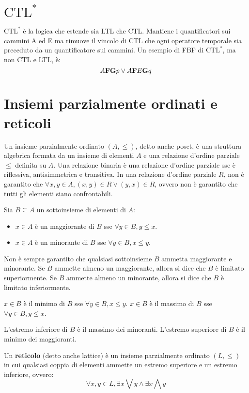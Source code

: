 \section{$\text{CTL}^*$}
$\text{CTL}^*$ è la logica che estende sia LTL che CTL. Mantiene i quantificatori
sui cammini A ed E ma rimuove il vincolo di CTL che ogni operatore temporale
sia preceduto da un quantificatore sui cammini.
Un esempio di FBF di $\text{CTL}^*$, ma non CTL e LTL, è:
\[
    A \textnormal{\textbf{F}} \textnormal{\textbf{G}} p \lor A \textnormal{\textbf{F}} E \textnormal{\textbf{G}} q
\]


\section{Insiemi parzialmente ordinati e reticoli}
Un insieme parzialmente ordinato $(A, \le)$, detto anche poset, è una struttura
algebrica formata da un insieme di elementi $A$ e una relazione d'ordine parziale
$\le$ definita su $A$.
Una relazione binaria è una relazione d'ordine parziale sse è riflessiva,
antisimmetrica e transitiva.
In una relazione d'ordine parziale $R$, non è garantito che
$\forall x, y \in A, (x,y) \in R \lor (y,x) \in R$, ovvero non è garantito
che tutti gli elementi siano confrontabili.

Sia $B \subseteq A$ un sottoinsieme di elementi di $A$:
\begin{itemize}
    \item $x \in A$ è un maggiorante di $B$ sse $\forall y \in B, y \le x$.
    \item $x \in A$ è un minorante di $B$ sse $\forall y \in B, x \le y$.
\end{itemize}
Non è sempre garantito che qualsiasi sottoinsieme $B$ ammetta maggiorante
e minorante.
Se $B$ ammette almeno un maggiorante, allora si dice che $B$ è limitato
superiormente.
Se $B$ ammette almeno un minorante, allora si dice che $B$ è limitato
inferiormente.

$x \in B$ è il minimo di $B$ sse $\forall y \in B, x \le y$.
$x \in B$ è il massimo di $B$ sse $\forall y \in B, y \le x$.

L'estremo inferiore di $B$ è il massimo dei minoranti.
L'estremo superiore di $B$ è il minimo dei maggioranti.

\begin{defn}
    Un \textbf{reticolo} (detto anche lattice) è un insieme parzialmente ordinato $(L, \le)$ in cui
    qualsiasi coppia di elementi ammette un estremo superiore e un estremo
    inferiore, ovvero:
    \[
        \forall x, y \in L, \exists x \bigvee y \land \exists x \bigwedge y
    \]
\end{defn}

